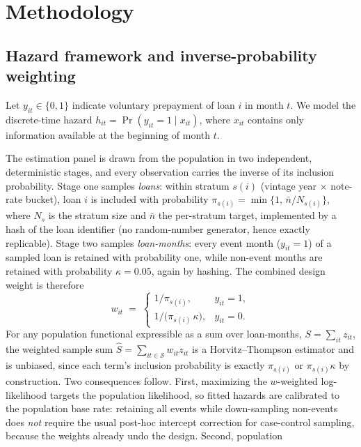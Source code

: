 \documentclass[11pt]{article}
\begin{document}
\section{Methodology}
\label{sec:method}

\subsection{Hazard framework and inverse-probability weighting}
\label{sec:ipw}

Let $y_{it} \in \{0,1\}$ indicate voluntary prepayment of loan $i$ in month $t$. We model the
discrete-time hazard $h_{it} = \Pr(y_{it}=1 \mid x_{it})$, where $x_{it}$ contains only
information available at the beginning of month $t$.

The estimation panel is drawn from the population in two independent, deterministic stages, and
every observation carries the inverse of its inclusion probability. Stage one samples
\emph{loans}: within stratum $s(i)$ (vintage year $\times$ note-rate bucket), loan $i$ is
included with probability $\pi_{s(i)} = \min\{1,\, \bar n / N_{s(i)}\}$, where $N_s$ is the
stratum size and $\bar n$ the per-stratum target, implemented by a hash of the loan identifier
(no random-number generator, hence exactly replicable). Stage two samples \emph{loan-months}:
every event month ($y_{it}=1$) of a sampled loan is retained with probability one, while
non-event months are retained with probability $\kappa = 0.05$, again by hashing. The combined
design weight is therefore
\begin{equation}
w_{it} \;=\;
\begin{cases}
1/\pi_{s(i)}, & y_{it}=1,\\[2pt]
1/\bigl(\pi_{s(i)}\,\kappa\bigr), & y_{it}=0 .
\end{cases}
\end{equation}
For any population functional expressible as a sum over loan-months,
$S = \sum_{it} z_{it}$, the weighted sample sum $\hat S = \sum_{it \in \mathcal{S}} w_{it}
z_{it}$ is a Horvitz--Thompson estimator and is unbiased, since each term's inclusion
probability is exactly $\pi_{s(i)}$ or $\pi_{s(i)}\kappa$ by construction. Two consequences
follow. First, maximizing the $w$-weighted log-likelihood targets the population likelihood, so
fitted hazards are calibrated to the population base rate: retaining all events while
down-sampling non-events does \emph{not} require the usual post-hoc intercept correction for
case-control sampling, because the weights already undo the design. Second, population
\end{document}
